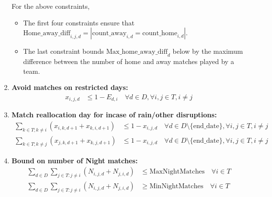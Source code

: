 \documentclass[a4paper, 12pt]{article}
\begin{document}
\begin{enumerate}
    For the above constraints,
    \begin{itemize}
        \item The first four constraints ensure that $\text{Home\_away\_diff}_{i,j,d} = |\text{count\_away}_{i,d} = \text{count\_home}_{i,d}|$.
        \item The last constraint bounds $\text{Max\_home\_away\_diff}_{d}$ below by the maximum difference between the number of home and away matches played by a team.
    \end{itemize}
    \item \textbf{Avoid matches on restricted days:}
    \begin{align*}
        x_{i,j,d} &\leq 1 - E_{d,i} \quad \forall d \in D, \forall i,j \in T, i \neq j
    \end{align*}

    \item \textbf{Match reallocation day for incase of rain/other disruptions:}
    \begin{align*}
         \sum_{k \in T; k \neq i} (x_{i,k,d+1} + x_{k,i,d+1})  &\leq 1 - x_{i,j,d} \quad \forall d \in D \setminus \{ \text{end\_date} \},
         \forall i,j \in T, i \neq j\\
         \sum_{k \in T; k \neq j} (x_{j,k,d+1} + x_{k,j,d+1}) &\leq 1 - x_{i,j,d} \quad \forall d \in D \setminus \{ \text{end\_date} \},
         \forall i,j \in T, i \neq j
    \end{align*}

    \item \textbf{Bound on number of Night matches:}
    \begin{align*}
        \sum_{d \in D} \sum_{j \in T : j \neq i} (N_{i,j,d} + N_{j,i,d}) &\leq \text{MaxNightMatches} \quad \forall i \in T\\
        \sum_{d \in D} \sum_{j \in T : j \neq i} (N_{i,j,d} + N_{j,i,d}) &\geq \text{MinNightMatches} \quad \forall i \in T
    \end{align*}


\end{enumerate}
\end{document}
